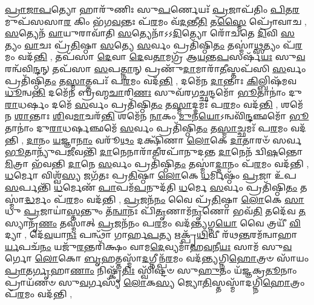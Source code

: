 \-\ul{𑌪𑍍𑌰𑌾}\-\-\ul{𑌜𑌾}\-\-\ul{𑌪}\-𑌤𑍍𑌯𑍋 𑌹𑌾𑌰𑍁᳴𑌣𑌿𑌃 𑌸𑍁\-\ul{𑌪}\-𑌰𑍍𑌣𑍇𑌯𑌃᳴ \ul{𑌪𑍍𑌰}\-𑌜𑌾𑌪᳴𑌤𑌿𑌂 \ul{𑌪𑌿}\-𑌤\-\ul{𑌰}\-𑌮𑍁𑌪᳴𑌸𑌸𑌾\-\ul{𑌰} 𑌕𑌿𑌂 𑌭᳴𑌗\-\ul{𑌵}\-𑌨𑍍𑌤𑌃 𑌪᳴\-\ul{𑌰}\-𑌮𑌂 𑌵᳴\-\ul{𑌦}\-𑌨𑍍𑌤𑍀\-\ul{𑌤𑌿} 𑌤\-\ul{𑌸𑍍𑌮𑍈} 𑌪𑍍𑌰𑍋᳴𑌵𑌾𑌚 \sep
\-\ul{𑌸}\-𑌤𑍍𑌯𑍇𑌨᳴ \ul{𑌵𑌾}\-𑌯𑍁𑌰𑌾𑌵𑌾᳴𑌤𑌿 \ul{𑌸}\-𑌤𑍍𑌯𑍇𑌨𑌾᳴𑌽𑌽\-\ul{𑌦𑌿}\-𑌤𑍍𑌯𑍋 𑌰𑍋᳴𑌚𑌤𑍇 \ul{𑌦𑌿}\-𑌵𑌿 \ul{𑌸}\-𑌤𑍍𑌯𑌂 \ul{𑌵𑌾}\-𑌚𑌃 𑌪𑍍𑌰᳴\-\ul{𑌤𑌿}\-𑌷𑍍𑌠𑌾 \ul{𑌸}\-𑌤𑍍𑌯𑍇 \ul{𑌸}\-𑌰𑍍𑌵𑌂 𑌪𑍍𑌰𑌤𑌿᳴𑌷𑍍𑌠𑌿\-\ul{𑌤𑌂} 𑌤𑌸𑍍𑌮𑌾॑\-\ul{𑌥𑍍𑌸}\-𑌤𑍍𑌯𑌂 𑌪᳴\-\ul{𑌰}\-𑌮𑌂 𑌵𑌦᳴\-\ul{𑌨𑍍𑌤𑌿} \sep
𑌤𑌪᳴𑌸𑌾 \ul{𑌦𑍇}\-𑌵𑌾 \ul{𑌦𑍇}\-𑌵\-\ul{𑌤𑌾}\-𑌮𑌗𑍍𑌰᳴ 𑌆\-\ul{𑌯}\-𑌨𑍍𑌤\-\ul{𑌪}\-𑌸𑌰𑍍\mbox{}𑌷᳴\-\ul{𑌯𑌃} 𑌸𑍁\-\ul{𑌵}\-𑌰𑌨𑍍𑌵᳴𑌵𑌿\-\ul{𑌨𑍍𑌦}\-𑌨𑍍 𑌤𑌪᳴𑌸𑌾 \ul{𑌸}\-𑌪\-\ul{𑌤𑍍𑌨𑌾}\-𑌨𑍍 𑌪𑍍𑌰𑌣𑍁᳴\-\ul{𑌦𑌾}\-𑌮𑌾𑌰𑌾᳴\-\ul{𑌤𑍀}\-𑌸𑍍𑌤𑌪᳴𑌸𑌿 \ul{𑌸}\-𑌰𑍍𑌵𑌂 𑌪𑍍𑌰𑌤𑌿᳴𑌷𑍍𑌠𑌿\-\ul{𑌤𑌂} 𑌤\-\ul{𑌸𑍍𑌮𑌾}\-𑌤𑍍𑌤𑌪𑌃᳴ 𑌪\-\ul{𑌰}\-𑌮𑌂 𑌵𑌦᳴\-\ul{𑌨𑍍𑌤𑌿} \sep
𑌦𑌮𑍇᳴𑌨 \ul{𑌦𑌾}\-𑌨𑍍𑌤𑌾𑌃 \ul{𑌕𑌿}\-𑌲𑍍𑌬𑌿𑌷᳴𑌮𑌵\-\ul{𑌧𑍂}\-𑌨𑍍𑌵\-\ul{𑌨𑍍𑌤𑌿} 𑌦𑌮𑍇᳴𑌨 𑌬𑍍𑌰𑌹𑍍𑌮\-\ul{𑌚𑌾}\-𑌰𑌿\-\ul{𑌣𑌃} 𑌸𑍁𑌵᳴𑌰𑌗\-\ul{𑌚𑍍𑌛}\-𑌨𑍍𑌦𑌮𑍋᳴ \ul{𑌭𑍂}\-𑌤𑌾𑌨𑌾𑌂॑ 𑌦𑍁\-\ul{𑌰𑌾}\-𑌧𑌰𑍍\mbox{}\-\ul{𑌷𑌂} 𑌦𑌮𑍇᳴ \ul{𑌸}\-𑌰𑍍𑌵𑌂 𑌪𑍍𑌰𑌤𑌿᳴𑌷𑍍𑌠𑌿\-\ul{𑌤𑌂} 𑌤\-\ul{𑌸𑍍𑌮𑌾}\-𑌦𑍍𑌦𑌮𑌃᳴ 𑌪\-\ul{𑌰}\-𑌮𑌂 𑌵𑌦᳴\-\ul{𑌨𑍍𑌤𑌿} \sep
𑌶𑌮𑍇᳴𑌨 \ul{𑌶𑌾}\-𑌨𑍍𑌤𑌾𑌃  \ul{𑌶𑌿}\-𑌵\-\ul{𑌮𑌾}\-𑌚𑌰᳴\-\ul{𑌨𑍍𑌤𑌿} 𑌶𑌮𑍇᳴𑌨 \ul{𑌨𑌾}\-𑌕𑌂 \ul{𑌮𑍁}\-𑌨\-\ul{𑌯𑍋}\-𑌽𑌨𑍍𑌵𑌵𑌿᳴\-\ul{𑌨𑍍𑌦}\-𑌞𑍍𑌛𑌮𑍋᳴ \ul{𑌭𑍂}\-𑌤𑌾𑌨𑌾𑌂॑ 𑌦𑍁\-\ul{𑌰𑌾}\-𑌧𑌰𑍍\mbox{}\-\ul{𑌷}\-𑌞𑍍𑌛𑌮𑍇᳴ \ul{𑌸}\-𑌰𑍍𑌵𑌂 𑌪𑍍𑌰𑌤𑌿᳴𑌷𑍍𑌠𑌿\-\ul{𑌤𑌂} 𑌤\-\ul{𑌸𑍍𑌮𑌾}\-𑌚𑍍𑌛𑌮𑌃᳴ 𑌪\-\ul{𑌰}\-𑌮𑌂 𑌵𑌦᳴𑌨𑍍𑌤𑌿 \sep
\-\ul{𑌦𑌾}\-𑌨𑌂 \ul{𑌯}\-𑌜𑍍𑌞𑌾\-\ul{𑌨𑌾𑌂} 𑌵𑌰𑍂᳴\-\ul{𑌥𑌂} 𑌦𑌕𑍍𑌷𑌿᳴𑌣𑌾 \ul{𑌲𑍋}\-𑌕𑍇 \ul{𑌦𑌾}\-𑌤𑌾𑌰𑍞᳴ 𑌸𑌰𑍍𑌵\-\ul{𑌭𑍂}\-𑌤𑌾𑌨𑍍𑌯𑍁᳴𑌪\-\ul{𑌜𑍀}\-𑌵𑌨𑍍𑌤𑌿᳴ \ul{𑌦𑌾}\-𑌨𑍇𑌨𑌾𑌰𑌾᳴\-\ul{𑌤𑍀}\-𑌰𑌪𑌾᳴𑌨𑍁𑌦𑌨𑍍𑌤 \ul{𑌦𑌾}\-𑌨𑍇𑌨᳴ 𑌦𑍍𑌵𑌿\-\ul{𑌷}\-𑌨𑍍𑌤𑍋 \ul{𑌮𑌿}\-𑌤𑍍𑌰𑌾 𑌭᳴𑌵𑌨𑍍𑌤𑌿 \ul{𑌦𑌾}\-𑌨𑍇 \ul{𑌸}\-𑌰𑍍𑌵𑌂 𑌪𑍍𑌰𑌤𑌿᳴𑌷𑍍𑌠𑌿\-\ul{𑌤𑌂} 𑌤𑌸𑍍𑌮𑌾॑\-\ul{𑌦𑍍𑌦𑌾}\-𑌨𑌂 𑌪᳴\-\ul{𑌰}\-𑌮𑌂 𑌵𑌦᳴𑌨𑍍𑌤𑌿 \sep
\-\ul{𑌧}\-𑌰𑍍𑌮𑍋 𑌵𑌿𑌶𑍍𑌵᳴\-\ul{𑌸𑍍𑌯} 𑌜𑌗᳴𑌤𑌃 𑌪𑍍𑌰\-\ul{𑌤𑌿}\-𑌷𑍍𑌠𑌾 \ul{𑌲𑍋}\-𑌕𑍇 \ul{𑌧}\-𑌰𑍍𑌮𑌿𑌷𑍍𑌠𑌂᳴ \ul{𑌪𑍍𑌰}\-𑌜𑌾 𑌉᳴𑌪\-\ul{𑌸}\-𑌰𑍍𑌪𑌨𑍍𑌤𑌿᳴ \ul{𑌧}\-𑌰𑍍𑌮𑍇𑌣᳴ \ul{𑌪𑌾}\-𑌪𑌮᳴\-\ul{𑌪}\-𑌨𑍁𑌦᳴𑌤𑌿 \ul{𑌧}\-𑌰𑍍𑌮𑍇 \ul{𑌸}\-𑌰𑍍𑌵𑌂 𑌪𑍍𑌰𑌤𑌿᳴𑌷𑍍𑌠𑌿\-\ul{𑌤𑌂} 𑌤𑌸𑍍𑌮𑌾॑\-\ul{𑌦𑍍𑌧}\-𑌰𑍍𑌮𑌂 𑌪᳴\-\ul{𑌰}\-𑌮𑌂 𑌵𑌦᳴𑌨𑍍𑌤𑌿 \sep
\-\ul{𑌪𑍍𑌰}\-𑌜𑌨᳴\-\ul{𑌨𑌂} 𑌵𑍈 𑌪𑍍𑌰᳴\-\ul{𑌤𑌿}\-𑌷𑍍𑌠𑌾 \ul{𑌲𑍋}\-𑌕𑍇 \ul{𑌸𑌾}\-𑌧𑍁 \ul{𑌪𑍍𑌰}\-𑌜𑌾𑌯𑌾॑\-\ul{𑌸𑍍𑌤}\-𑌨𑍍𑌤𑍁𑌂 𑌤᳴\-\ul{𑌨𑍍𑌵𑌾}\-𑌨𑌃 𑌪𑌿᳴\-\ul{𑌤𑍃}\-𑌣𑌾𑌮᳴\-\ul{𑌨𑍃}\-𑌣𑍋 𑌭𑌵᳴\-\ul{𑌤𑌿} 𑌤𑌦𑍇᳴𑌵 \ul{𑌤}\-𑌸𑍍𑌯𑌾𑌨𑍃᳴\-\ul{𑌣𑌂} 𑌤𑌸𑍍𑌮𑌾॑𑌤𑍍 \ul{𑌪𑍍𑌰}\-𑌜𑌨᳴𑌨𑌂 𑌪\-\ul{𑌰}\-𑌮𑌂 𑌵𑌦᳴\-\ul{𑌨𑍍𑌤𑍍𑌯}\-𑌗𑍍𑌨\-\ul{𑌯𑍋} 𑌵𑍈 𑌤𑍍𑌰𑌯𑍀᳴ \ul{𑌵𑌿}\-𑌦𑍍𑌯𑌾 \sep
 𑌦𑍇᳴\-\ul{𑌵}\-𑌯𑌾\-\ul{𑌨𑌃} 𑌪𑌨𑍍𑌥𑌾᳴ 𑌗𑌾𑌰𑍍\mbox{}𑌹\-\ul{𑌪}\-𑌤𑍍𑌯 𑌋𑌕𑍍𑌪𑍃᳴\-\ul{𑌥𑌿}\-𑌵𑍀 𑌰᳴𑌥\-\ul{𑌨𑍍𑌤}\-𑌰𑌮᳴𑌨𑍍𑌵𑌾𑌹𑌾\-\ul{𑌰𑍍𑌯}\-𑌪𑌚᳴\-\ul{𑌨𑌂} 𑌯𑌜𑍁᳴\-\ul{𑌰}\-𑌨𑍍𑌤𑌰𑌿᳴𑌕𑍍𑌷𑌂 𑌵𑌾𑌮\-\ul{𑌦𑍇}\-𑌵𑍍𑌯𑌮𑌾᳴𑌹\-\ul{𑌵}\-𑌨𑍀\-\ul{𑌯𑌃} 𑌸𑌾𑌮᳴ 𑌸𑍁\-\ul{𑌵}\-𑌰𑍍𑌗𑍋 \ul{𑌲𑍋}\-𑌕𑍋 \ul{𑌬𑍃}\-𑌹𑌤𑍍𑌤𑌸𑍍𑌮𑌾᳴\-\ul{𑌦}\-𑌗𑍍𑌨𑍀𑌨𑍍𑌪᳴\-\ul{𑌰}\-𑌮𑌂 𑌵𑌦᳴𑌨𑍍𑌤𑍍𑌯𑌗𑍍𑌨𑌿\-\ul{𑌹𑍋}\-𑌤𑍍𑌰𑍞 𑌸𑌾᳴𑌯𑌂 \ul{𑌪𑍍𑌰𑌾}\-𑌤\-\ul{𑌰𑍍𑌗𑍃}\-𑌹𑌾\-\ul{𑌣𑌾𑌂} 𑌨𑌿𑌷𑍍𑌕𑍃᳴\-\ul{𑌤𑌿𑌃} 𑌸𑍍𑌵𑌿᳴𑌷𑍍𑌟𑍞 𑌸𑍁\-\ul{𑌹𑍁}\-𑌤𑌂 𑌯᳴𑌜𑍍𑌞𑌕𑍍𑌰\-\ul{𑌤𑍂}\-𑌨𑌾𑌂 𑌪𑍍𑌰𑌾𑌯᳴𑌣𑍞 𑌸𑍁\-\ul{𑌵}\-𑌰𑍍𑌗𑌸𑍍𑌯᳴ \ul{𑌲𑍋}\-𑌕\-\ul{𑌸𑍍𑌯} 𑌜𑍍𑌯𑍋\-\ul{𑌤𑌿}\-𑌸𑍍𑌤𑌸𑍍𑌮𑌾᳴𑌦𑌗𑍍𑌨𑌿\-\ul{𑌹𑍋}\-𑌤𑍍𑌰𑌂 𑌪᳴\-\ul{𑌰}\-𑌮𑌂 𑌵𑌦᳴𑌨𑍍𑌤𑌿 \sep
